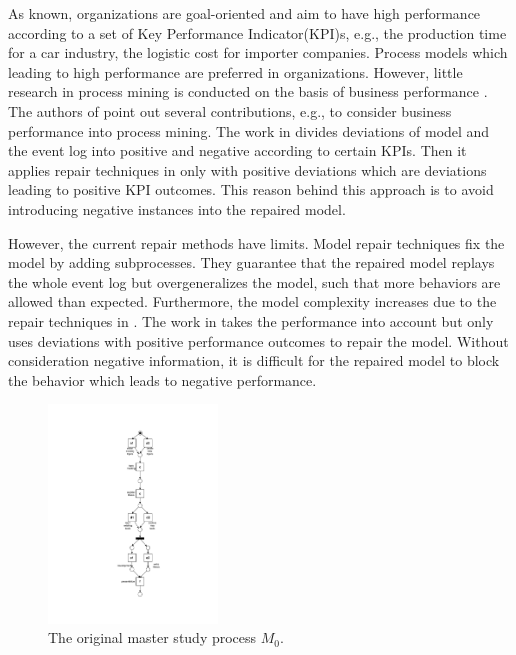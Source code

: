 As known, organizations are goal-oriented and aim to have high performance according to a set of Key Performance Indicator(KPI)s, e.g., the production time for a car industry, the logistic cost for importer companies. Process models which leading to high performance are preferred in organizations.  However, little research in process mining is conducted on the basis of business performance \cite{ghasemi2019event}.  The authors of  \cite{ghasemi2019event} point out several contributions, e.g.,   \cite{dees2017enhancing} to consider business performance into process mining. The work in  \cite{dees2017enhancing} divides deviations of model and the event log into positive and negative according to certain KPIs. Then it applies repair techniques in  \cite{fahland2012repairing} only with positive deviations which are deviations leading to positive KPI outcomes. This reason behind this approach  is to avoid introducing negative instances into the repaired model. 

However, the current repair methods have limits. Model repair techniques fix the model by adding subprocesses. They guarantee that the repaired model replays the whole event log but overgeneralizes the model, such that more behaviors are allowed than expected. Furthermore, the model complexity increases due to the repair techniques in \cite{fahland2012repairing}.  The work in \cite{dees2017enhancing} takes the performance into account but only uses deviations with positive performance outcomes to repair the model. Without consideration negative information, it is difficult for the repaired model to block the behavior which leads to negative performance.
 
\begin{figure}
	\centering
	\includegraphics[clip, trim=8.5cm 3cm 7cm 3cm, width=0.4\textwidth, height=0.6\textheight]{figures/introduction/thesis-demo-final-original-model.pdf}
	\caption{The original master study process $M_0$.}
	\label{fig:demo-M0}
\end{figure} 

